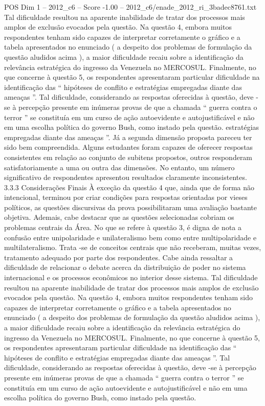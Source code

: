\begin{textsample}{POS Dim 1 – 2012\_c6 – Score -1.00 – 2012\_c6/enade\_2012\_ri\_3badec8761.txt}
Tal dificuldade resultou na aparente inabilidade de tratar dos processos mais amplos de exclusão evocados pela questão.
Na questão 4, embora muitos respondentes tenham sido capazes de interpretar corretamente o gráfico e a tabela apresentados no enunciado ( a despeito dos problemas de formulação da questão aludidos acima ), a maior dificuldade recaiu sobre a identificação da relevância estratégica do ingresso da Venezuela no MERCOSUL.
Finalmente, no que concerne à questão 5, os respondentes apresentaram particular dificuldade na identificação das “ hipóteses de conflito e estratégias empregadas diante das ameaças ”.
Tal dificuldade, considerando as respostas oferecidas à questão, deve -se à percepção presente em inúmeras provas de que a chamada “ guerra contra o terror ” se constituía em um curso de ação autoevidente e autojustificável e não em uma escolha política do governo Bush, como instado pela questão. estratégias empregadas diante das ameaças ”.
Já a segunda dimensão proposta pareceu ter sido bem compreendida.
Alguns estudantes foram capazes de oferecer respostas consistentes em relação ao conjunto de subitens propostos, outros responderam satisfatoriamente a uma ou outra das dimensões.
No entanto, um número significativo de respondentes apresentou resultados claramente inconsistentes. 3.3.3 Considerações Finais À exceção da questão 4 que, ainda que de forma não intencional, terminou por criar condições para respostas orientadas por vieses políticos, as questões discursivas da prova possibilitaram uma avaliação bastante objetiva.
Ademais, cabe destacar que as questões selecionadas cobriam os problemas centrais da Área.
No que se refere à questão 3, é digna de nota a confusão entre unipolaridade e unilateralismo bem como entre multipolaridade e multilateralismo.
Trata -se de conceitos centrais que não receberam, muitas vezes, tratamento adequado por parte dos respondentes.
Cabe ainda ressaltar a dificuldade de relacionar o debate acerca da distribuição de poder no sistema internacional e os processos econômicos no interior desse sistema.
Tal dificuldade resultou na aparente inabilidade de tratar dos processos mais amplos de exclusão evocados pela questão.
Na questão 4, embora muitos respondentes tenham sido capazes de interpretar corretamente o gráfico e a tabela apresentados no enunciado ( a despeito dos problemas de formulação da questão aludidos acima ), a maior dificuldade recaiu sobre a identificação da relevância estratégica do ingresso da Venezuela no MERCOSUL.
Finalmente, no que concerne à questão 5, os respondentes apresentaram particular dificuldade na identificação das “ hipóteses de conflito e estratégias empregadas diante das ameaças ”.
Tal dificuldade, considerando as respostas oferecidas à questão, deve -se à percepção presente em inúmeras provas de que a chamada “ guerra contra o terror ” se constituía em um curso de ação autoevidente e autojustificável e não em uma escolha política do governo Bush, como instado pela questão.

\end{textsample}
